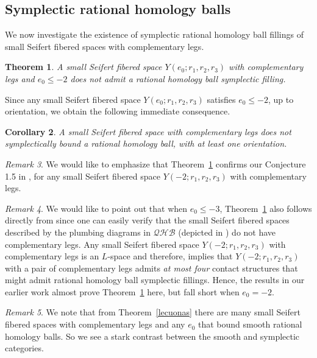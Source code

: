 \documentclass[11pt]{amsart}
\theoremstyle{plain}
\newtheorem{theorem}{Theorem}
\newtheorem{corollary}[theorem]{Corollary}
\theoremstyle{definition}
\theoremstyle{remark}
\newtheorem{remark}[theorem]{Remark}
\numberwithin{theorem}{section}
\begin{document}
\subsection{Symplectic rational homology balls}
We now investigate the existence of symplectic rational homology ball fillings of small Seifert fibered spaces with complementary legs.
\begin{theorem}\label{thm: smallSFSnotfillable} A small Seifert fibered space $Y(e_0; r_1, r_2, r_3)$ with complementary legs and $e_0\leq -2$ does not admit a rational homology ball symplectic filling. 
 \end{theorem} 
Since any small Seifert fibered space $Y(e_0; r_1, r_2, r_3)$ satisfies $e_0 \leq -2$, up to orientation, we obtain the following immediate consequence.
\begin{corollary} A small Seifert fibered space with complementary legs does not symplectically bound a rational homology ball, with at least one orientation.
\end{corollary}
\begin{remark} We would like to emphasize that Theorem~\ref{thm: smallSFSnotfillable} confirms our Conjecture 1.5 in \cite{EtnyreOzbagciTosun2025}, for any small Seifert fibered space $Y(-2; r_1, r_2, r_3)$  with complementary legs. 
\end{remark}
\begin{remark} We would like to point out that when $e_0 \leq -3$, Theorem~\ref{thm: smallSFSnotfillable} also follows directly from  \cite[Theorem 1.1]{EtnyreOzbagciTosun2025} since one can easily verify that the small Seifert fibered spaces described by the plumbing diagrams in $\mathcal{QHB}$ (depicted in \cite[Figure 3]{EtnyreOzbagciTosun2025}) do not have complementary legs.   Any small Seifert fibered space $Y(-2; r_1, r_2, r_3)$ with complementary legs is an $L$-space and therefore,  \cite[Corollary 1.6]{EtnyreOzbagciTosun2025} implies that $Y(-2; r_1, r_2, r_3)$ with a pair of complementary legs admits {\em at most four} contact structures that might admit rational homology ball symplectic fillings. Hence, the results in our earlier work \cite{EtnyreOzbagciTosun2025} almost prove Theorem~\ref{thm: smallSFSnotfillable}  here,  but fall short when $e_0=-2$. 
\end{remark} 
\begin{remark}
We note that from Theorem~\ref{lecuonas} there are many small Seifert fibered spaces with complementary legs and any $e_0$ that bound smooth rational homology balls. So we see a stark contrast between the smooth and symplectic categories. 
\end{remark}
\end{document}
